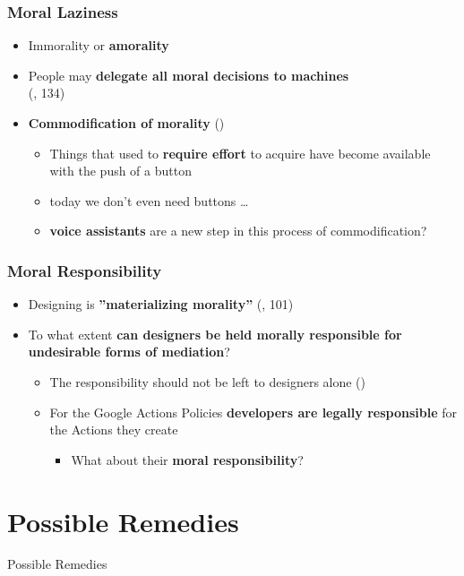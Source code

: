 \documentclass{beamer}
\begin{document}
\begin{frame}
\frametitle{Moral Laziness}
\begin{itemize}
	\item Immorality or \textbf{amorality}
	\medskip
	\item People may \textbf{delegate all moral decisions to machines} \\(\cite{verbeek2011moralizing}, 134)
	\medskip
	\item \textbf{Commodification of morality} (\cite{borgmann1984technology})
		 \begin{itemize}
		 	\item Things that used to \textbf{require effort} to acquire have become
		 	available with the push of a button
		 	\smallskip
		 	\item today we don't even need buttons \dots
		 	\smallskip
		 	\item \textbf{voice assistants} are a new step in this process of commodification?
		 \end{itemize}
\end{itemize}
\end{frame}

\begin{frame}
	\frametitle{Moral Responsibility}
	\begin{itemize}
		\item Designing is \textbf{''materializing morality''} (\cite{verbeek2011moralizing}, 101)
		\bigskip
		\item To what extent \textbf{can designers be held morally responsible for undesirable forms of mediation}?
		\smallskip
		\begin{itemize}
			\item The responsibility should not be left to designers alone (\cite{verbeek2011moralizing})
			\medskip
			\item For the Google Actions Policies \textbf{developers are legally responsible} for the Actions they create
			\smallskip
			\begin{itemize}
				\item What about their \textbf{moral responsibility}?
			\end{itemize}
		\end{itemize}
	\end{itemize}
\end{frame}

\section{Possible Remedies}
\begin{frame}
\begin{center} 
	 Possible Remedies
\end{center}
\end{frame}
\end{document}
